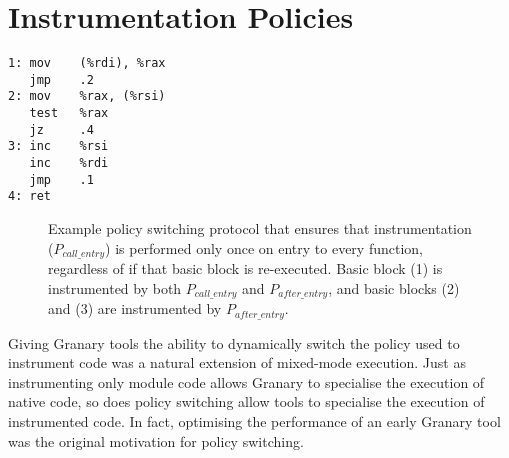 \documentclass[preprint]{sigplanconf}
\let\ORIGcaption\caption
\begin{document}
\section{Instrumentation Policies}\label{sec:policies}


\lstset{language=[x64]Assembler}
\newsavebox\asmbox
\begin{lrbox}{\asmbox}
\begin{minipage}[b]{4cm}
\begin{lstlisting}[basicstyle=\footnotesize\ttfamily]
1: mov    (%rdi), %rax
   jmp    .2
2: mov    %rax, (%rsi)
   test   %rax
   jz     .4
3: inc    %rsi
   inc    %rdi
   jmp    .1
4: ret
\end{lstlisting}
\end{minipage}
\end{lrbox}

\begin{figure*}[ht!]
\centering
{}
\hfill
\hfill
\ORIGcaption{\label{fig:policy_switching}Example policy switching protocol that ensures that instrumentation ($P_{call\_entry}$) is performed only once on entry to every function, regardless of if that basic block is re-executed. Basic block (1) is instrumented by both $P_{call\_entry}$ and $P_{after\_entry}$, and basic blocks (2) and (3) are instrumented by $P_{after\_entry}$.}
\end{figure*}

Giving Granary tools the ability to dynamically switch the policy used to instrument code was a natural extension of mixed-mode execution. Just as instrumenting only module code allows Granary to specialise the execution of native code, so does policy switching allow tools to specialise the execution of instrumented code. In fact, optimising the performance of an early Granary tool was the original motivation for policy switching.
\end{document}
